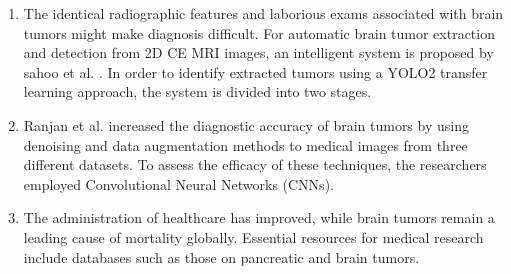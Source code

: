 \documentclass{article}
\begin{document}
\begin{enumerate}
    
    \item The identical radiographic features and laborious exams associated with brain tumors might make diagnosis difficult. For automatic brain tumor extraction and detection from 2D CE MRI images, an intelligent system is proposed by sahoo et al. \cite{sahoo2023efficient}. In order to identify extracted tumors using a YOLO2 transfer learning approach, the system is divided into two stages.
    
    
    \item Ranjan et al. \cite{ranjbarzadeh2021brain} increased the diagnostic accuracy of brain tumors by using denoising and data augmentation methods to medical images from three different datasets. To assess the efficacy of these techniques, the researchers employed Convolutional Neural Networks (CNNs).
    
    
    \item \cite{khan2024brain}The administration of healthcare has improved, while brain tumors remain a leading cause of mortality globally. Essential resources for medical research include databases such as those on pancreatic and brain tumors.


\end{enumerate}
\end{document}
